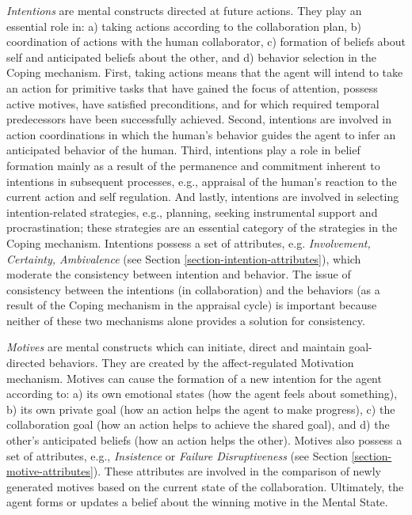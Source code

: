 \documentclass[12pt]{report}
\begin{document}
\textit{Intentions} are mental constructs directed at future actions. They play
an essential role in: a) taking actions according to the collaboration plan, b)
coordination of actions with the human collaborator, c) formation of beliefs
about self and anticipated beliefs about the other, and d) behavior selection in
the Coping mechanism. First, taking actions means that the agent will intend to
take an action for primitive tasks that have gained the focus of attention,
possess active motives, have satisfied preconditions, and for which required
temporal predecessors have been successfully achieved. Second, intentions are
involved in action coordinations in which the human's behavior guides the agent
to infer an anticipated behavior of the human. Third, intentions play a role in
belief formation mainly as a result of the permanence and commitment inherent to
intentions in subsequent processes, e.g., appraisal of the human's reaction to
the current action and self regulation. And lastly, intentions are involved in
selecting intention-related strategies, e.g., planning, seeking instrumental
support and procrastination; these strategies are an essential category of the
strategies in the Coping mechanism. Intentions possess a set of attributes, e.g.
\textit{Involvement, Certainty, Ambivalence} (see Section
\ref{section-intention-attributes}), which moderate the consistency between
intention and behavior. The issue of consistency between the intentions (in
collaboration) and the behaviors (as a result of the Coping mechanism in the
appraisal cycle) is important because neither of these two mechanisms alone
provides a solution for consistency.

\textit{Motives} are mental constructs which can initiate, direct and maintain
goal-directed behaviors. They are created by the affect-regulated Motivation
mechanism. Motives can cause the formation of a new intention for the agent
according to: a) its own emotional states (how the agent feels about something),
b) its own private goal (how an action helps the agent to make progress), c) the
collaboration goal (how an action helps to achieve the shared goal), and d) the
other's anticipated beliefs (how an action helps the other). Motives also
possess a set of attributes, e.g., \textit{Insistence} or \textit{Failure
Disruptiveness} (see Section \ref{section-motive-attributes}). These attributes
are involved in the comparison of newly generated motives based on the current
state of the collaboration. Ultimately, the agent forms or updates a belief
about the winning motive in the Mental State.
\end{document}
